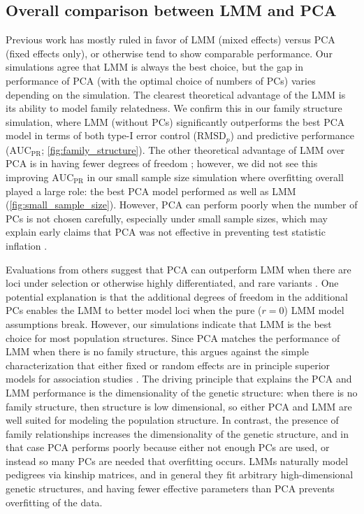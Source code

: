 \documentclass[11pt]{article}
\newcommand{\rmsd}{\text{RMSD}_p}
\newcommand{\auc}{\text{AUC}_\text{PR}}
\begin{document}
\subsection{Overall comparison between LMM and PCA}

Previous work has mostly ruled in favor of LMM (mixed effects) versus PCA (fixed effects only), or otherwise tend to show comparable performance.
Our simulations agree that LMM is always the best choice, but the gap in performance of PCA (with the optimal choice of numbers of PCs) varies depending on the simulation.
The clearest theoretical advantage of the LMM is its ability to model family relatedness.
We confirm this in our family structure simulation, where LMM (without PCs) significantly outperforms the best PCA model in terms of both type-I error control ($\rmsd$) and predictive performance ($\auc$; \cref{fig:family_structure}).
The other theoretical advantage of LMM over PCA is in having fewer degrees of freedom \citep{hoffman_correcting_2013}; however, we did not see this improving $\auc$ in our small sample size simulation where overfitting overall played a large role: the best PCA model performed as well as LMM (\cref{fig:small_sample_size}).
However, PCA can perform poorly when the number of PCs is not chosen carefully, especially under small sample sizes, which may explain early claims that PCA was not effective in preventing test statistic inflation \citep{epstein_simple_2007, kimmel_randomization_2007, luca_use_2008}.

Evaluations from others suggest that PCA can outperform LMM when there are loci under selection or otherwise highly differentiated, and rare variants \citep{price_new_2010, wu_comparison_2011, yang_advantages_2014}.
One potential explanation is that the additional degrees of freedom in the additional PCs enables the LMM to better model loci when the pure ($r=0$) LMM model assumptions break.
However, our simulations indicate that LMM is the best choice for most population structures.
Since PCA matches the performance of LMM when there is no family structure, this argues against the simple characterization that either fixed or random effects are in principle superior models for association studies \citep{price_new_2010, sul_mixed_2013, price_response_2013, sul_population_2018}.
The driving principle that explains the PCA and LMM performance is the dimensionality of the genetic structure:
when there is no family structure, then structure is low dimensional, so either PCA and LMM are well suited for modeling the population structure.
In contrast, the presence of family relationships increases the dimensionality of the genetic structure, and in that case PCA performs poorly because either not enough PCs are used, or instead so many PCs are needed that overfitting occurs.
LMMs naturally model pedigrees via kinship matrices, and in general they fit arbitrary high-dimensional genetic structures, and having fewer effective parameters than PCA prevents overfitting of the data.
\end{document}
